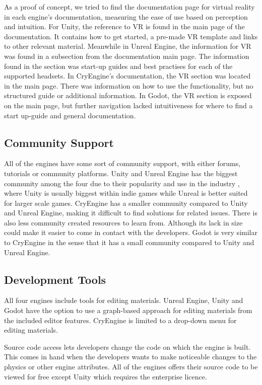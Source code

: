 As a proof of concept, we tried to find the documentation page for virtual reality in each engine's documentation, measuring the ease of use based on perception and intuition. For Unity, the reference to VR is found in the main page of the documentation. It contains how to get started, a pre-made VR template and links to other relevant material. Meanwhile in Unreal Engine, the information for VR was found in a subsection from the documentation main page. The information found in the section was start-up guides and best practises for each of the supported headsets. In CryEngine's documentation, the VR section was located in the main page. There was information on how to use the functionality, but no structured guide or additional information. In Godot, the VR section is exposed on the main page, but further navigation lacked intuitiveness for where to find a start up-guide and general documentation. 



\subsection{Community Support}
All of the engines have some sort of community support, with either forums, tutorials or community platforms. Unity and Unreal Engine has the biggest community among the four due to their popularity and use in the industry \cite{buckley_2022}, where Unity is usually biggest within indie games while Unreal is better suited for larger scale games. \cite{evercast}
CryEngine has a smaller community compared to Unity and Unreal Engine, making it difficult to find solutions for related issues. There is also less community created resources to learn from. Although its lack in size could make it easier to come in contact with the developers. \cite{cryengine_dealessandri_2020}
Godot is very similar to CryEngine in the sense that it has a small community compared to Unity and Unreal Engine. 
\cite{godot_dealessandri_2020}

\subsection{Development Tools}
All four engines include tools for editing materials. Unreal Engine, Unity and Godot have the option to use a graph-based approach for editing materials from the included editor features. CryEngine is limited to a drop-down menu for editing materials.

Source code access lets developers change the code on which the engine is built. This comes in hand when the developers wants to make noticeable changes to the physics or other engine attributes. All of the engines offers their source code to be viewed for free except Unity which requires the enterprise licence.

